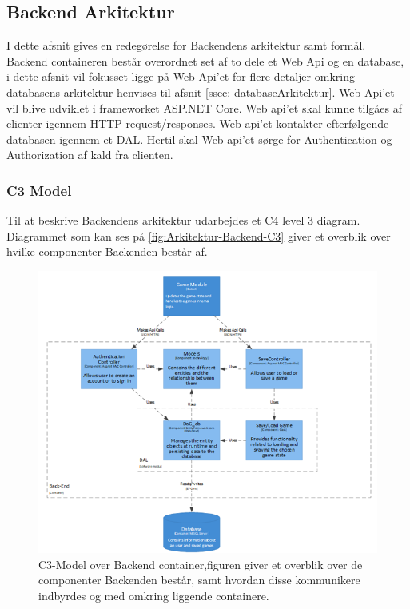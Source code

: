 \subsection{Backend Arkitektur}
\label{ssec: BackendArkitektur}
I dette afsnit gives en redegørelse for Backendens arkitektur samt formål.\\ 
 
\noindent Backend containeren består overordnet set af to dele et Web Api og en database, i dette afsnit vil fokusset ligge på Web Api'et for flere detaljer omkring databasens arkitektur henvises til afsnit \autoref{ssec: databaseArkitektur}. Web Api'et vil blive udviklet i frameworket ASP.NET Core. Web api'et skal kunne tilgåes af clienter igennem HTTP request/responses. Web api'et kontakter efterfølgende databasen igennem et DAL. Hertil skal Web api'et sørge for Authentication og Authorization af kald fra clienten.\\

\subsubsection{C3 Model}

\noindent Til at beskrive Backendens arkitektur udarbejdes et C4 level 3 diagram. Diagrammet som kan ses på \autoref{fig:Arkitektur-Backend-C3} giver et overblik over hvilke componenter Backenden består af.
 
\begin{figure}[H]
\centering
\includegraphics[width = \textwidth]{02-Body/Images/Backend_C3.PNG}
\caption{C3-Model over Backend container,figuren giver et overblik over de componenter Backenden består, samt hvordan disse kommunikere indbyrdes og med omkring liggende containere.}
\label{fig:Arkitektur-Backend-C3}
\end{figure}

